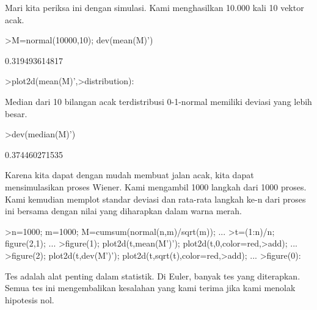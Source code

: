 \documentclass[a4paper,10pt]{article}
\begin{document}
\begin{eulernotebook}
\begin{eulercomment}
\begin{eulercomment}
\begin{eulercomment}
\begin{eulercomment}
\begin{eulercomment}
\begin{eulercomment}
\begin{eulercomment}
\begin{eulercomment}
\begin{eulercomment}
\begin{eulercomment}
\begin{eulercomment}
\begin{eulercomment}
\begin{eulercomment}
\begin{eulercomment}
\begin{eulercomment}
\begin{eulercomment}
\begin{eulercomment}
\begin{eulercomment}
\begin{eulercomment}
Mari kita periksa ini dengan simulasi. Kami menghasilkan 10.000 kali
10 vektor acak.
\end{eulercomment}
\begin{eulerprompt}
>M=normal(10000,10); dev(mean(M)')
\end{eulerprompt}
\begin{euleroutput}
  0.319493614817
\end{euleroutput}
\begin{eulerprompt}
>plot2d(mean(M)',>distribution):
\end{eulerprompt}
\begin{eulercomment}
Median dari 10 bilangan acak terdistribusi 0-1-normal memiliki deviasi
yang lebih besar.
\end{eulercomment}
\begin{eulerprompt}
>dev(median(M)')
\end{eulerprompt}
\begin{euleroutput}
  0.374460271535
\end{euleroutput}
\begin{eulercomment}
Karena kita dapat dengan mudah membuat jalan acak, kita dapat
mensimulasikan proses Wiener. Kami mengambil 1000 langkah dari 1000
proses. Kami kemudian memplot standar deviasi dan rata-rata langkah
ke-n dari proses ini bersama dengan nilai yang diharapkan dalam warna
merah.
\end{eulercomment}
\begin{eulerprompt}
>n=1000; m=1000; M=cumsum(normal(n,m)/sqrt(m)); ...
>t=(1:n)/n; figure(2,1); ...
>figure(1); plot2d(t,mean(M')'); plot2d(t,0,color=red,>add); ...
>figure(2); plot2d(t,dev(M')'); plot2d(t,sqrt(t),color=red,>add); ...
>figure(0):
\end{eulerprompt}
\begin{eulercomment}
Tes adalah alat penting dalam statistik. Di Euler, banyak tes yang
diterapkan. Semua tes ini mengembalikan kesalahan yang kami terima
jika kami menolak hipotesis nol.


\end{eulercomment}
\end{eulercomment}
\end{eulercomment}
\end{eulercomment}
\end{eulercomment}
\end{eulercomment}
\end{eulercomment}
\end{eulercomment}
\end{eulercomment}
\end{eulercomment}
\end{eulercomment}
\end{eulercomment}
\end{eulercomment}
\end{eulercomment}
\end{eulercomment}
\end{eulercomment}
\end{eulercomment}
\end{eulercomment}
\end{eulercomment}
\end{eulernotebook}
\end{document}
